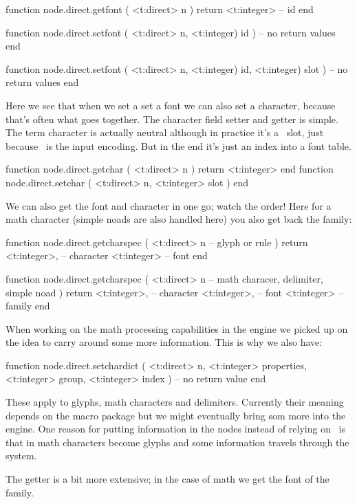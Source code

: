 \starttyping[option=LUA]
function node.direct.getfont (
    <t:direct> n
)
    return <t:integer> -- id
end

function node.direct.setfont (
    <t:direct>  n,
    <t:integer) id
)
    -- no return values
end

function node.direct.setfont (
    <t:direct>  n,
    <t:integer) id,
    <t:integer) slot
)
    -- no return values
end
\stoptyping

Here we see that when we set a set a font we can also set a character, because
that's often what goes together. The character field setter and getter is simple.
The term character is actually neutral although in practice it's a \UNICODE\
slot, just because \ is the input encoding. But in the end it's just an
index into a font table.

\starttyping[option=LUA]
function node.direct.getchar ( <t:direct> n ) return <t:integer> end
function node.direct.setchar ( <t:direct> n, <t:integer> slot ) end
\stoptyping

We can also get the font and character in one go; watch the order! Here for a
math character (simple noads are also handled here) you also get back the family:

\starttyping[option=LUA]
function node.direct.getcharspec (
    <t:direct> n -- glyph or rule
)
    return
        <t:integer>, -- character
        <t:integer>  -- font
end

function node.direct.getcharspec (
    <t:direct> n -- math characer, delimiter, simple noad
)
    return
        <t:integer>, -- character
        <t:integer>,  -- font
        <t:integer>  -- family
end
\stoptyping

When working on the  math processing capabilities in the engine
we picked up on the idea to carry around some more information. This is why we
also have:

\starttyping[option=LUA]
function node.direct.setchardict (
    <t:direct>  n,
    <t:integer> properties,
    <t:integer> group,
    <t:integer> index
)
        -- no return value
end
\stoptyping

These apply to glyphs, math characters and delimiters. Currently their meaning
depends on the macro package but we might eventually bring som more into the
engine. One reason for putting information in the nodes instead of relying on
\LUA\ is that in math characters become glyphs and some information travels
through the system.

The getter is a bit more extensive; in the case of math we get the font of the
family.


